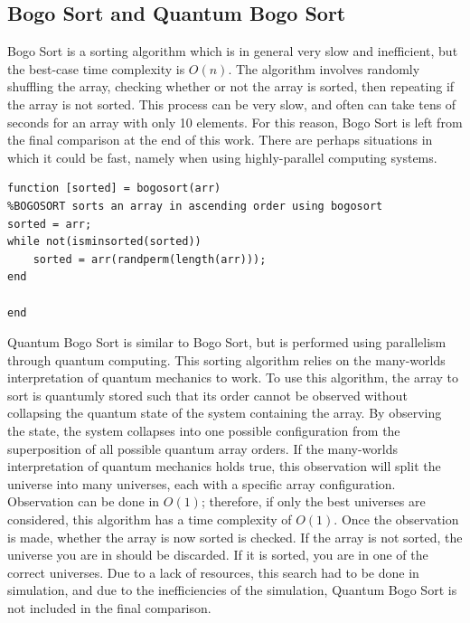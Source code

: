 \documentclass[a4paper]{article}
\begin{document}
\subsection{Bogo Sort and Quantum Bogo Sort}
Bogo Sort is a sorting algorithm which is in general very slow and inefficient, but the best-case time complexity is $O(n)$. The algorithm involves randomly shuffling the array, checking whether or not the array is sorted, then repeating if the array is not sorted. This process can be very slow, and often can take tens of seconds for an array with only 10 elements. For this reason, Bogo Sort is left from the final comparison at the end of this work. There are perhaps situations in which it could be fast, namely when using highly-parallel computing systems.

\begin{lstlisting}
function [sorted] = bogosort(arr)
%BOGOSORT sorts an array in ascending order using bogosort
sorted = arr;
while not(isminsorted(sorted))
    sorted = arr(randperm(length(arr)));
end

end
\end{lstlisting}

Quantum Bogo Sort is similar to Bogo Sort, but is performed using parallelism through quantum computing. This sorting algorithm relies on the many-worlds interpretation of quantum mechanics to work. To use this algorithm, the array to sort is quantumly stored such that its order cannot be observed without collapsing the quantum state of the system containing the array. By observing the state, the system collapses into one possible configuration from the superposition of all possible quantum array orders. If the many-worlds interpretation of quantum mechanics holds true, this observation will split the universe into many universes, each with a specific array configuration. Observation can be done in $O(1)$; therefore, if only the best universes are considered, this algorithm has a time complexity of $O(1)$. Once the observation is made, whether the array is now sorted is checked. If the array is not sorted, the universe you are in should be discarded. If it is sorted, you are in one of the correct universes. Due to a lack of resources, this search had to be done in simulation, and due to the inefficiencies of the simulation, Quantum Bogo Sort is not included in the final comparison.
\end{document}
